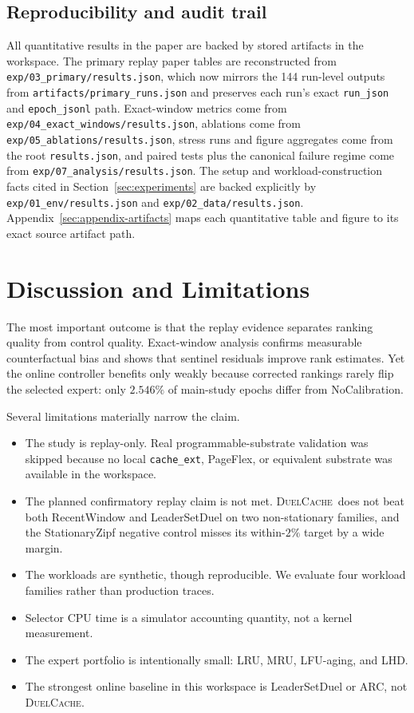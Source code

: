 \documentclass{article}
\newcommand{\duel}{\textsc{DuelCache}}
\begin{document}
\subsection{Reproducibility and audit trail}

All quantitative results in the paper are backed by stored artifacts in the workspace. The primary replay paper tables are reconstructed from \texttt{exp/03\_primary/results.json}, which now mirrors the 144 run-level outputs from \texttt{artifacts/primary\_runs.json} and preserves each run's exact \texttt{run\_json} and \texttt{epoch\_jsonl} path. Exact-window metrics come from \texttt{exp/04\_exact\_windows/results.json}, ablations come from \texttt{exp/05\_ablations/results.json}, stress runs and figure aggregates come from the root \texttt{results.json}, and paired tests plus the canonical failure regime come from \texttt{exp/07\_analysis/results.json}. The setup and workload-construction facts cited in Section~\ref{sec:experiments} are backed explicitly by \texttt{exp/01\_env/results.json} and \texttt{exp/02\_data/results.json}. Appendix~\ref{sec:appendix-artifacts} maps each quantitative table and figure to its exact source artifact path.

\section{Discussion and Limitations}
\label{sec:discussion}

The most important outcome is that the replay evidence separates ranking quality from control quality. Exact-window analysis confirms measurable counterfactual bias and shows that sentinel residuals improve rank estimates. Yet the online controller benefits only weakly because corrected rankings rarely flip the selected expert: only $2.546\%$ of main-study epochs differ from NoCalibration.

Several limitations materially narrow the claim.
\begin{itemize}
\item The study is replay-only. Real programmable-substrate validation was skipped because no local \texttt{cache\_ext}, PageFlex, or equivalent substrate was available in the workspace.
\item The planned confirmatory replay claim is not met. \duel\ does not beat both RecentWindow and LeaderSetDuel on two non-stationary families, and the StationaryZipf negative control misses its within-$2\%$ target by a wide margin.
\item The workloads are synthetic, though reproducible. We evaluate four workload families rather than production traces.
\item Selector CPU time is a simulator accounting quantity, not a kernel measurement.
\item The expert portfolio is intentionally small: LRU, MRU, LFU-aging, and LHD.
\item The strongest online baseline in this workspace is LeaderSetDuel or ARC, not \duel.
\end{itemize}
\end{document}
